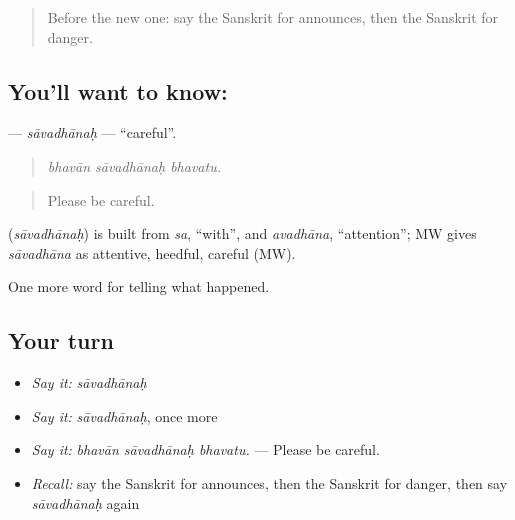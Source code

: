 \label{lesson:SA-C299-savadhanah}



\begin{quote}
Before the new one: say the Sanskrit for announces, then the Sanskrit for danger.
\end{quote}

\subsection*{You'll want to know: }
\textbf{} — \emph{sāvadhānaḥ} — \textquotedblleft{}careful\textquotedblright{}.

\begin{quote}
  
\end{quote}

\begin{quote}
\emph{bhavān sāvadhānaḥ bhavatu.}
\end{quote}

\begin{quote}
Please be careful.
\end{quote}

\begin{cousinweb}
\textbf{} (\emph{sāvadhānaḥ}) is built from \emph{sa}, \textquotedblleft{}with\textquotedblright{}, and \emph{avadhāna}, \textquotedblleft{}attention\textquotedblright{}; MW gives \emph{sāvadhāna} as attentive, heedful, careful (MW).
\end{cousinweb}

\begin{grammarlens}[title={What you've built}]
One more word for telling what happened.
\end{grammarlens}

\subsection*{Your turn}
\begin{itemize}
\raggedright
  \item \emph{Say it:} \emph{sāvadhānaḥ}
  \item \emph{Say it:} \emph{sāvadhānaḥ}, once more
  \item \emph{Say it:} \emph{bhavān sāvadhānaḥ bhavatu.} — Please be careful.
  \item \emph{Recall:} say the Sanskrit for announces, then the Sanskrit for danger, then say \emph{sāvadhānaḥ} again
\end{itemize}

